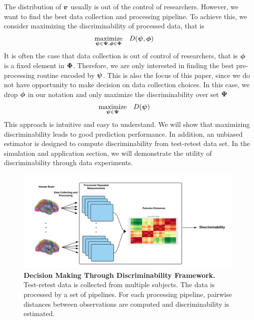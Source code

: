 \documentclass{article}
\begin{document}
 The distribution of $\boldsymbol{v}$ usually is out of the control of researchers. However, we want to find the best data collection and processing pipeline. To achieve this, we consider maximizing the discriminability of processed data, that is  
\begin{equation} 
\begin{aligned}
& \underset{\boldsymbol{\psi} \in \boldsymbol{\Psi},\boldsymbol{\phi} \in \boldsymbol{\Phi}}{\text{maximize}}
& & D(\boldsymbol{\psi},\boldsymbol{\phi})
\end{aligned}
\end{equation}
It is often the case that data collection is out of control of researchers, that is $\boldsymbol{\phi}$ is a fixed element in $\boldsymbol{\Phi}$. Therefore, we are only interested in finding the best pre-processing routine encoded by $\boldsymbol{\psi}$. This is also the focus of this paper, since we do not have opportunity to make decision on data collection choices. In this case, we drop $\boldsymbol{\phi}$ in our notation and only maximize the discriminability over set $\boldsymbol{\Psi}$
\begin{equation} 
\begin{aligned}
& \underset{\boldsymbol{\psi} \in \boldsymbol{\Psi}}{\text{maximize}}
& & D(\boldsymbol{\psi})
\end{aligned}
\end{equation}
This approach is intuitive and easy to understand. We will show that maximizing discriminability leads to good prediction performance. In addition, an unbiased estimator is designed to compute discriminability from test-retest data set. In the simulation and application section, we will demonstrate the utility of discriminability through data experiments.

\begin{figure}[ht!]
	\includegraphics[width=\linewidth]{../Figs/flow_chart.png}
	\caption{{\bf Decision Making Through Discriminability Framework.} Test-retest data is collected from multiple subjects. The data is processed by a set of pipelines. For each processing pipeline, pairwise distances between observations are computed and discriminability is estimated. }
	\label{fig:fc}
\end{figure}
\end{document}
